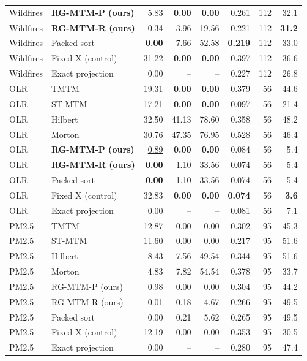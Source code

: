 \begin{longtable}{llrrrrrr}
Wildfires & \textbf{RG-MTM-P (ours)} & \underline{5.83} & \textbf{0.00} & \textbf{0.00} & 0.261 & 112 & 32.1\\
Wildfires & \textbf{RG-MTM-R (ours)} & 0.34 & 3.96 & 19.56 & 0.221 & 112 & \textbf{31.2}\\
Wildfires & Packed sort & \textbf{0.00} & 7.66 & 52.58 & \textbf{0.219} & 112 & 33.0\\
Wildfires & Fixed X (control) & 31.22 & \textbf{0.00} & \textbf{0.00} & 0.397 & 112 & 36.6\\
Wildfires & Exact projection & 0.00 & -- & -- & 0.227 & 112 & 26.8\\
OLR & TMTM & 19.31 & \textbf{0.00} & \textbf{0.00} & 0.379 & 56 & 44.6\\
OLR & ST-MTM & 17.21 & \textbf{0.00} & \textbf{0.00} & 0.097 & 56 & 21.4\\
OLR & Hilbert & 32.50 & 41.13 & 78.60 & 0.358 & 56 & 48.2\\
OLR & Morton & 30.76 & 47.35 & 76.95 & 0.528 & 56 & 46.4\\
OLR & \textbf{RG-MTM-P (ours)} & \underline{0.89} & \textbf{0.00} & \textbf{0.00} & 0.084 & 56 & 5.4\\
OLR & \textbf{RG-MTM-R (ours)} & \textbf{0.00} & 1.10 & 33.56 & 0.074 & 56 & 5.4\\
OLR & Packed sort & \textbf{0.00} & 1.10 & 33.56 & 0.074 & 56 & 5.4\\
OLR & Fixed X (control) & 32.83 & \textbf{0.00} & \textbf{0.00} & \textbf{0.074} & 56 & \textbf{3.6}\\
OLR & Exact projection & 0.00 & -- & -- & 0.081 & 56 & 7.1\\
PM2.5 & TMTM & 12.87 & 0.00 & 0.00 & 0.302 & 95 & 45.3\\
PM2.5 & ST-MTM & 11.60 & 0.00 & 0.00 & 0.217 & 95 & 51.6\\
PM2.5 & Hilbert & 8.43 & 7.56 & 49.54 & 0.344 & 95 & 51.6\\
PM2.5 & Morton & 4.83 & 7.82 & 54.54 & 0.378 & 95 & 33.7\\
PM2.5 & RG-MTM-P (ours) & 0.98 & 0.00 & 0.00 & 0.304 & 95 & 44.2\\
PM2.5 & RG-MTM-R (ours) & 0.01 & 0.18 & 4.67 & 0.266 & 95 & 49.5\\
PM2.5 & Packed sort & 0.00 & 0.21 & 5.62 & 0.265 & 95 & 49.5\\
PM2.5 & Fixed X (control) & 12.19 & 0.00 & 0.00 & 0.353 & 95 & 30.5\\
PM2.5 & Exact projection & 0.00 & -- & -- & 0.280 & 95 & 47.4\\

\end{longtable}
